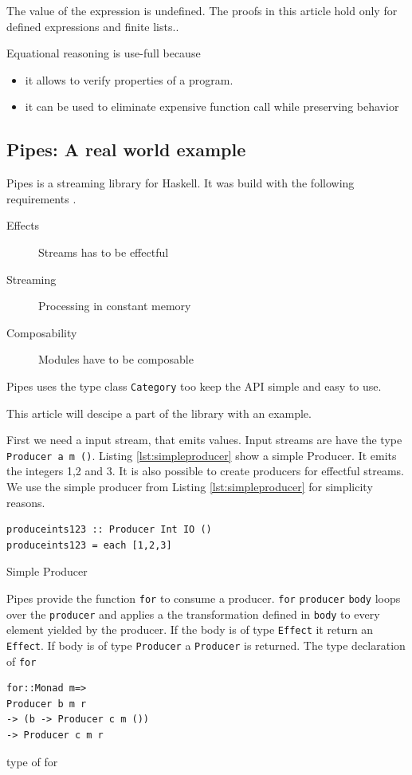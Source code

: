 The value of the expression is undefined. The proofs in this article hold only for defined expressions and finite lists..

Equational reasoning is use-full because
\begin{itemize}
\item it allows to verify properties of a program.
\item it can be used to eliminate expensive function call while preserving behavior
\end{itemize}



\subsection{Pipes: A real world example}
\label{sec:pipes}
Pipes is a streaming library for Haskell. It was build with the following requirements \cite{gonzales13}.
\begin{description}
\item[Effects] Streams has to be effectful
\item[Streaming] Processing in constant memory
\item[Composability] Modules have to be composable
\end{description}

Pipes uses the type class \verb|Category| too keep the API simple and easy to use.

This article will descipe a part of the library with an example.

First we need a input stream, that emits values. Input streams are have the type 
\verb|Producer a m ()|.
Listing \ref{lst:simpleproducer} show a simple Producer. It emits the integers 1,2 and 3. It is also possible to create producers for effectful streams. We use the simple producer from Listing \ref{lst:simpleproducer} for simplicity reasons.

\begin{program}
\begin{verbatim}
produceints123 :: Producer Int IO ()
produceints123 = each [1,2,3]
\end{verbatim}
\caption{Simple Producer}
\label{lst:simpleproducer}
\end{program}

Pipes provide the function \verb|for| to consume a producer. 
\verb|for| \verb|producer| \verb|body| loops over the \verb|producer| and applies a the transformation defined in \verb|body| to every element yielded by the producer. If the body is of type \verb|Effect| it return an \verb|Effect|. If body is of type \verb|Producer| a \verb|Producer| is returned. The type declaration of \verb|for| 
\begin{program}
\begin{verbatim}
for::Monad m=>
Producer b m r
-> (b -> Producer c m ())
-> Producer c m r
\end{verbatim}
\caption{type of for}
\end{program}

